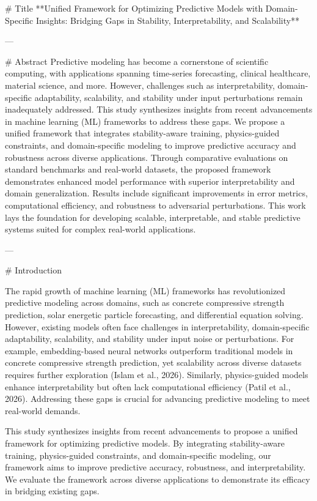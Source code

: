 # Title
**Unified Framework for Optimizing Predictive Models with Domain-Specific Insights: Bridging Gaps in Stability, Interpretability, and Scalability**

---

# Abstract
Predictive modeling has become a cornerstone of scientific computing, with applications spanning time-series forecasting, clinical healthcare, material science, and more. However, challenges such as interpretability, domain-specific adaptability, scalability, and stability under input perturbations remain inadequately addressed. This study synthesizes insights from recent advancements in machine learning (ML) frameworks to address these gaps. We propose a unified framework that integrates stability-aware training, physics-guided constraints, and domain-specific modeling to improve predictive accuracy and robustness across diverse applications. Through comparative evaluations on standard benchmarks and real-world datasets, the proposed framework demonstrates enhanced model performance with superior interpretability and domain generalization. Results include significant improvements in error metrics, computational efficiency, and robustness to adversarial perturbations. This work lays the foundation for developing scalable, interpretable, and stable predictive systems suited for complex real-world applications.

---

# Introduction

The rapid growth of machine learning (ML) frameworks has revolutionized predictive modeling across domains, such as concrete compressive strength prediction, solar energetic particle forecasting, and differential equation solving. However, existing models often face challenges in interpretability, domain-specific adaptability, scalability, and stability under input noise or perturbations. For example, embedding-based neural networks outperform traditional models in concrete compressive strength prediction, yet scalability across diverse datasets requires further exploration (Islam et al., 2026). Similarly, physics-guided models enhance interpretability but often lack computational efficiency (Patil et al., 2026). Addressing these gaps is crucial for advancing predictive modeling to meet real-world demands.

This study synthesizes insights from recent advancements to propose a unified framework for optimizing predictive models. By integrating stability-aware training, physics-guided constraints, and domain-specific modeling, our framework aims to improve predictive accuracy, robustness, and interpretability. We evaluate the framework across diverse applications to demonstrate its efficacy in bridging existing gaps.

